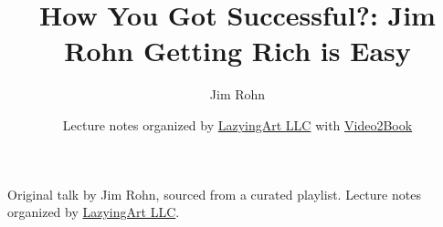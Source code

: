 \documentclass[11pt,oneside]{book}
\begin{document}
\frontmatter
\title{How You Got Successful?: Jim Rohn Getting Rich is Easy}
\author{Jim Rohn}
\date{Lecture notes organized by \href{https://lazying.art}{LazyingArt LLC} with \href{https://github.com/lachlanchen/Video2Book}{Video2Book}}
\maketitle
\begin{center}
\small Original talk by Jim Rohn, sourced from a curated playlist. Lecture notes organized by \href{https://lazying.art}{LazyingArt LLC}.
\end{center}
\clearpage
\mainmatter

\end{document}
